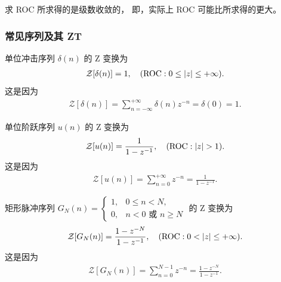 \begin{note}
    求 ROC 所求得的是级数收敛的，
    即，实际上 ROC 可能比所求得的更大。
\end{note}

\subsubsection{常见序列及其 ZT}

\begin{example}[单位冲激序列的 ZT]
    单位冲击序列 $\delta(n)$ 的 Z 变换为
    \begin{align*}
        \mathcal{Z}[\delta(n)] = 1, \quad (\text{ROC}: 0 \le \left|z\right| \le +\infty).
    \end{align*}
    这是因为
    \begin{align*}
        \mathcal{Z}[\delta(n)] = \sum_{n=-\infty}^{+\infty} \delta(n) z^{-n} = \delta(0) = 1.
    \end{align*}
\end{example}

\begin{example}[单位阶跃序列的 ZT]
    单位阶跃序列 $u(n)$ 的 Z 变换为
    \begin{align*}
        \mathcal{Z}[u(n)] = \frac{1}{1 - z^{-1}}, \quad (\text{ROC}: \left|z\right| > 1).
    \end{align*}
    这是因为
    \begin{align*}
        \mathcal{Z}[u(n)] = \sum_{n=0}^{+\infty} z^{-n} = \frac{1}{1 - z^{-1}}.
    \end{align*}
\end{example}

\begin{example}[矩形脉冲序列的 ZT]
    矩形脉冲序列 $G_N(n) = \begin{cases}
        1, & 0 \le n < N, \\
        0, & n < 0 \text{ 或 } n \ge N
    \end{cases}$ 的 Z 变换为
    \begin{align*}
        \mathcal{Z}[G_N(n)] = \frac{1 - z^{-N}}{1 - z^{-1}}, \quad (\text{ROC}: 0 < \left|z\right| \le +\infty).
    \end{align*}
    这是因为
    \begin{align*}
        \mathcal{Z}[G_N(n)] = \sum_{n=0}^{N-1} z^{-n} = \frac{1 - z^{-N}}{1 - z^{-1}}.
    \end{align*}
\end{example}

